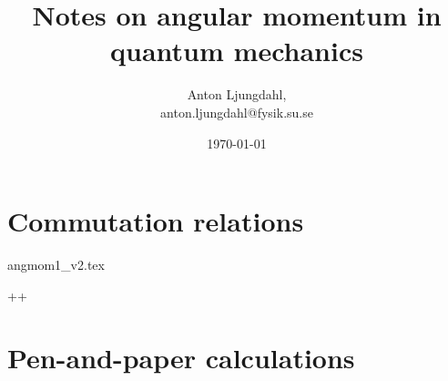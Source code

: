 \documentclass[12pt,a4paper]{article}
\numberwithin{equation}{section}
\begin{document}
\author{Anton Ljungdahl, \\
\small{anton.ljungdahl@fysik.su.se}}
\title{Notes on angular momentum in quantum mechanics}
\date{\today}
\maketitle
\tableofcontents
\section{Commutation relations}
{angmom1_v2.tex}

\appendix++
\section{Pen-and-paper calculations}

\end{document}
